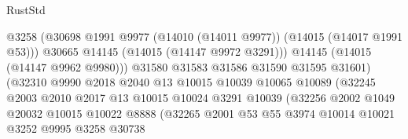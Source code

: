 \begin{lexlean}{RustStd}
\begin{coremodule}
                                          @3258
                                          (@30698
                                            @1991
                                            @9977
                                            (@14010 (@14011 @9977))
                                            (@14015 (@14017 @1991 @53)))
                                          @30665
                                          @14145
                                          (@14015 (@14147 @9972 @3291)))
                                        @14145
                                        (@14015 (@14147 @9962 @9980)))
                                      @31580
                                      @31583
                                      @31586
                                      @31590
                                      @31595
                                      @31601)
                                    (@32310
                                      @9990
                                      @2018
                                      @2040
                                      @13
                                      @10015
                                      @10039
                                      @10065
                                      @10089
                                      (@32245
                                        @2003
                                        @2010
                                        @2017
                                        @13
                                        @10015
                                        @10024
                                        @3291
                                        @10039
                                        (@32256
                                          @2002
                                          @1049
                                          @20032
                                          @10015
                                          @10022
                                          @8888
                                          (@32265
                                            @2001
                                            @53
                                            @55
                                            @3974
                                            @10014
                                            @10021
                                            @3252
                                            @9995
                                            @3258
                                            @30738

\end{coremodule}
\end{lexlean}
